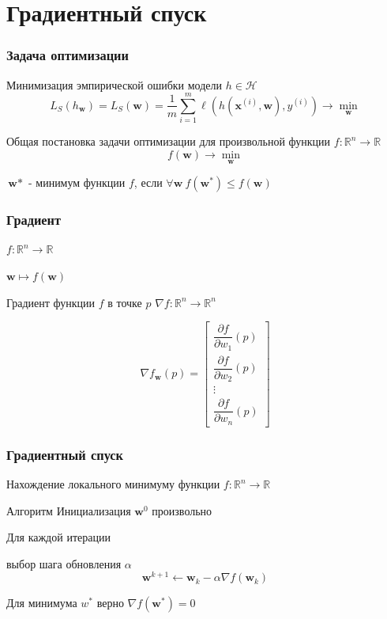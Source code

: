 \documentclass[notheorems]{beamer} %
\newcommand{\w}{\textbf{w}}
\begin{document}
\section{Градиентный спуск}
\begin{frame}
	\frametitle{Задача оптимизации}
	Минимизация эмпирической ошибки модели $ h \in \mathcal{H} $ 
	\begin{equation}
	L_S(h_{\textbf{w}}) = L_S(\textbf{w}) = \frac{1}{m}\sum_{i=1}^{m} \ell(h(\textbf{x}^{(i)}, \textbf{w}),y^{(i)})  \to \min_{\textbf{w}}
	\end{equation}
	
		\begin{block}{Общая постановка задачи оптимизации для произвольной функции 	
				$f: \mathbb{R}^n \to \mathbb{R}$				
			}
		\begin{equation}
		f(\textbf{w})   \to \min_{\textbf{w}}
		\end{equation}
	\end{block}
	$\w*$ - минимум функции $f$, если $\forall \w\ f(\w^*) \leq f(\w)$
\end{frame}
\begin{frame}
	\frametitle{Градиент}
	
	$f: \mathbb{R}^n \to \mathbb{R}$
	
	$\w \mapsto f(\w)$
	
	\begin{block}{Градиент функции $f$ в точке $p$ }
		$\nabla f: \mathbb{R}^n \to \mathbb{R}^n$ 
		
	
		$$
		\nabla f_{\w}(p)=\left[\begin{array}{c}
		\dfrac{\partial f}{\partial w_1}(p)\\
		\dfrac{\partial f}{\partial w_2}(p) \\
		\vdots \\
		\dfrac{\partial f}{\partial w_n}(p) 
		\end{array}\right]
		$$
		
	\end{block}
	
	

	
\end{frame}


\begin{frame}
	\frametitle{Градиентный спуск}
	
	Нахождение локального минимуму функции $f: \mathbb{R}^n \to \mathbb{R}$
	
	\begin{block}{Алгоритм }
		Инициализация $\w^0$ произвольно
		
		Для каждой итерации 
		
		выбор шага обновления $\alpha$
		$$ \w^{k+1} \leftarrow \w_{k}-\alpha\nabla f(\w_k) $$

		
	\end{block}

Для минимума $w^*$ верно $\nabla f(\w^*)=0$

\end{frame}
\end{document}
